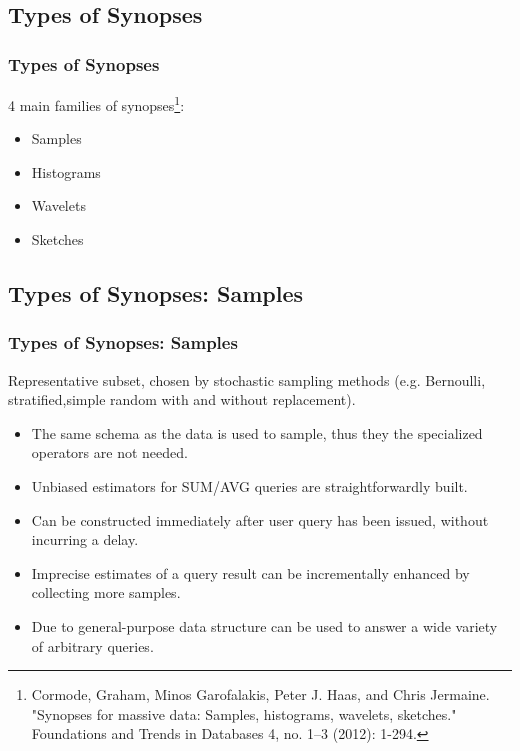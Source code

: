 \documentclass{beamer}
\begin{document}
\subsection{Types of Synopses}
\begin{frame}
\frametitle{Types of Synopses}
4 main families of synopses\footnote{\tiny Cormode, Graham, Minos Garofalakis, Peter J. Haas, and Chris Jermaine. "Synopses for massive data:
Samples, histograms, wavelets, sketches." Foundations and Trends in Databases 4, no. 1–3 (2012): 1-294.}:
\begin{itemize}
\vspace{0.3 cm}
\item{Samples}
\item{Histograms}
\item{Wavelets}
\item{Sketches}
\end{itemize}
\end{frame}

\subsection{Types of Synopses: Samples}
\begin{frame}
\frametitle{Types of Synopses: Samples}
Representative subset, chosen by stochastic sampling methods (e.g. Bernoulli, stratified,simple random with and without replacement).\pause
\vspace{0.2 cm}
\begin{itemize}
\item{The same schema as the data is used to sample, thus they the specialized operators are not needed.}
\item{Unbiased estimators for SUM/AVG queries are straightforwardly built.}
\item{Can be constructed immediately after user query has been issued, without incurring a delay.}
\item{Imprecise estimates of a query result can be incrementally enhanced by collecting more samples.}
\item{Due to general-purpose data structure can be used to answer a wide variety of arbitrary queries.}
\end{itemize}
\end{frame}
\end{document}
